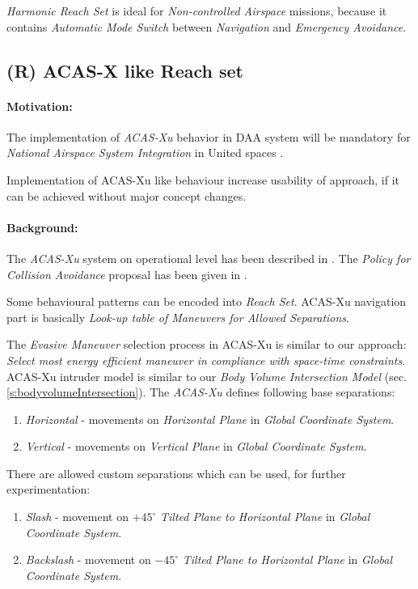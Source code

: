 \noindent \emph{Harmonic Reach Set} is ideal for \emph{Non-controlled Airspace} missions, because it contains \emph{Automatic Mode Switch} between \emph{Navigation} and \emph{Emergency Avoidance}.


\subsection{(R) ACAS-X like Reach set}\label{s:acasReachSet}
\paragraph{Motivation:} The implementation of \emph{ACAS-Xu} behavior in DAA system will  be mandatory for \emph{National Airspace System Integration} in United spaces \cite{shively2018uas}. 

Implementation of ACAS-Xu like behaviour increase usability of approach, if it can be achieved without major concept changes.


\paragraph{Background:} The \emph{ACAS-Xu} system on operational level has been described in \cite{marston2015acas}. The \emph{Policy for Collision Avoidance} proposal has been given in \cite{julian2016policy}.

Some behavioural patterns can be encoded into  \emph{Reach Set}. ACAS-Xu navigation part is basically \emph{Look-up table of Maneuvers for Allowed Separations}.
 
The \emph{Evasive Maneuver} selection process in ACAS-Xu is similar to our approach: \emph{Select most energy efficient maneuver in compliance with space-time constraints}. ACAS-Xu intruder model is similar to our \emph{Body Volume Intersection Model} (sec. \ref{s:bodyvolumeIntersection}). The \emph{ACAS-Xu} defines following base separations:

\begin{enumerate}
    \item \emph{Horizontal} - movements on \emph{Horizontal Plane} in \emph{Global Coordinate System}.
    
    \item \emph{Vertical} - movements on \emph{Vertical Plane} in \emph{Global Coordinate System}.
    
\end{enumerate}

\noindent There are allowed custom separations which can be used, for further experimentation: 
\begin{enumerate}
    \item \emph{Slash} - movement on $+45^{\circ}$ \emph{Tilted Plane to Horizontal Plane} in \emph{Global Coordinate System}.
    
    \item \emph{Backslash} - movement on $-45^{\circ}$ \emph{Tilted Plane to Horizontal Plane} in \emph{Global Coordinate System}.
    
\end{enumerate}


